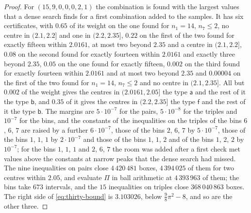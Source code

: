 \documentclass[11pt,reqno]{amsart}
\renewcommand{\_}{\origunderscore\allowbreak}
\numberwithin{equation}{section}
\theoremstyle{plain}
\theoremstyle{definition}
\theoremstyle{remark}
\begin{document}
\begin{proof}
For $(15,9,0,0,0,2,1)$ the combination is found with the largest values
that a dense search finds for a first combination added to the samples.
It has six certificates, with $0.65$ of its weight on the one found for
$n_1=14$, $n_7\le2$, no centre in $(2.1,2.2]$ and one in $(2.2,2.35]$,
$0.22$ on the first of the two found for exactly fifteen within $2.0161$,
at most two beyond $2.35$ and a centre in $(2.1,2.2]$, $0.08$ on the second
found for exactly fourteen within $2.0161$ and exactly three beyond $2.35$,
$0.05$ on the one found for exactly fifteen, $0.002$ on the third found for
exactly fourteen within $2.0161$ and at most two beyond $2.35$ and
$0.00004$ on the first of the two found for $n_1=14$, $n_7\le2$ and no
centre in $(2.1,2.35]$. All but $0.002$ of the weight gives the centres in
$(2.0161,2.05]$ the type $\mathsf a$ and the rest of it the type
$\mathsf b$, and $0.35$ of it gives the centres in $(2.2,2.35]$ the type
$\mathsf f$ and the rest of it the type $\mathsf b$. The margins are
$5\cdot10^{-7}$ for the pairs, $5\cdot10^{-8}$ for the triples and
$10^{-7}$ for the bins, and the constants of the inequalities on the
triples of the bins $6$, $6$, $7$ are raised by a further $6\cdot10^{-7}$,
those of the bins $2$, $6$, $7$ by $5\cdot10^{-7}$, those of the bins $1$,
$1$, $1$ by $2\cdot10^{-7}$ and those of the bins $1$, $1$, $2$ and of the
bins $1$, $2$, $2$ by $10^{-7}$; for the bins $1$, $1$, $1$ and $2$, $6$,
$7$ the room was added after a first check met values above the constants
at narrow peaks that the dense search had missed. The nine inequalities on
pairs close $4\,420\,481$ boxes, $4\,394\,025$ of them for two centres
within $2.05$, and evaluate $\Pi$ in ball arithmetic at $4\,393\,963$ of
them; the bins take $673$ intervals, and the $15$ inequalities on triples
close $368\,040\,863$ boxes. The right side of \eqref{eq:thirty-bound} is
$3.103026$, below $\frac98\pi^2-8$, and so are the other three.
\end{proof}
\end{document}
